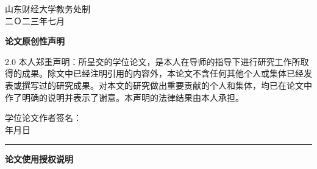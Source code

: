 \documentclass[a4paper,12pt]{ctexart}
\newcommand{\sanhao}{\fontsize{16pt}{24pt}\selectfont}
\newcommand{\sihao}{\fontsize{14pt}{21pt}\selectfont}
\newcommand{\fixedunderline}[2][8em]{\underline{\makebox[#1][c]{#2}}}
\numberwithin{equation}{section}
\begin{document}
\vspace{1.6cm}

\begin{center}
  {\songti\sihao 山东财经大学教务处制}\\[0.45cm]
  {\songti\sihao 二Ｏ二三年七月}
\end{center}

\newpage

\pagestyle{empty}

\begin{center}
  {\heiti\bfseries\sanhao 论文原创性声明}
\end{center}

\vspace{0.5cm}

\setlength{\parindent}{2em}
\begin{spacing}{2.0}
{\sihao
本人郑重声明：所呈交的学位论文，是本人在导师的指导下进行研究工作所取得的成果。除文中已经注明引用的内容外，本论文不含任何其他个人或集体已经发表或撰写过的研究成果。对本文的研究做出重要贡献的个人和集体，均已在论文中作了明确的说明并表示了谢意。本声明的法律结果由本人承担。
}
\end{spacing}

\vspace{1.9cm}

\begin{flushright}
  {\sihao 学位论文作者签名：\fixedunderline[6em]{}}\\[0.7cm]
  {\sihao \fixedunderline[2.4em]{}年\fixedunderline[2.2em]{}月\fixedunderline[2.2em]{}日}
\end{flushright}

\vspace{0.9cm}

\noindent\rule{\textwidth}{0.4pt}

\vspace{2.2cm}

\begin{center}
  {\heiti\bfseries\sanhao 论文使用授权说明}
\end{center}

\vspace{0.5cm}
\end{document}
